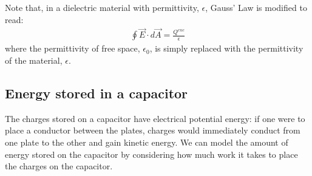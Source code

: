 
Note that, in a dielectric material with permittivity, $\epsilon$, Gauss' Law is modified to read:
\begin{align*}
\oint \vec E\cdot d\vec A=\frac{Q^{enc}}{\epsilon}
\end{align*}
where the permittivity of free space, $\epsilon_0$, is simply replaced with the permittivity of the material, $\epsilon$.

\subsection{Energy stored in a capacitor}
The charges stored on a capacitor have electrical potential energy: if one were to place a conductor between the plates, charges would immediately conduct from one plate to the other and gain kinetic energy. We can model the amount of energy stored on the capacitor by considering how much work it takes to place the charges on the capacitor.

